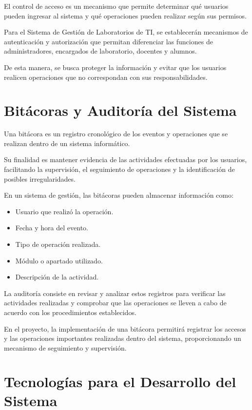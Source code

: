 El control de acceso es un mecanismo que permite determinar qué usuarios pueden ingresar al sistema y qué operaciones pueden realizar según sus permisos.

Para el Sistema de Gestión de Laboratorios de TI, se establecerán mecanismos de autenticación y autorización que permitan diferenciar las funciones de administradores, encargados de laboratorio, docentes y alumnos.

De esta manera, se busca proteger la información y evitar que los usuarios realicen operaciones que no correspondan con sus responsabilidades.

\section{Bitácoras y Auditoría del Sistema}

Una bitácora es un registro cronológico de los eventos y operaciones que se realizan dentro de un sistema informático.

Su finalidad es mantener evidencia de las actividades efectuadas por los usuarios, facilitando la supervisión, el seguimiento de operaciones y la identificación de posibles irregularidades.

En un sistema de gestión, las bitácoras pueden almacenar información como:

\begin{itemize}

    \item Usuario que realizó la operación.
    \item Fecha y hora del evento.
    \item Tipo de operación realizada.
    \item Módulo o apartado utilizado.
    \item Descripción de la actividad.

\end{itemize}

La auditoría consiste en revisar y analizar estos registros para verificar las actividades realizadas y comprobar que las operaciones se lleven a cabo de acuerdo con los procedimientos establecidos.

En el proyecto, la implementación de una bitácora permitirá registrar los accesos y las operaciones importantes realizadas dentro del sistema, proporcionando un mecanismo de seguimiento y supervisión.

\section{Tecnologías para el Desarrollo del Sistema}


